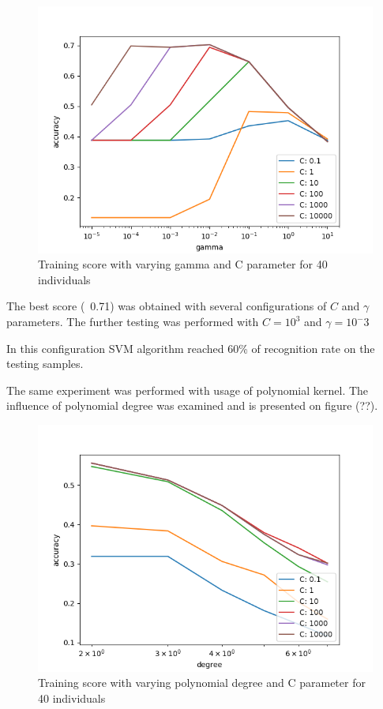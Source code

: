 \begin{figure}[H]
\centering
\includegraphics[scale=0.75]{img/svm/better_graphs/CFD_40i_rbf.png}
\caption{Training score with varying gamma and C parameter for 40 individuals}
\end{figure} 

The best score (~0.71) was obtained with several configurations of $C$ and $\gamma$ parameters. The further testing was performed with $C = 10^3$ and $\gamma = 10^-3$

In this configuration SVM algorithm reached 60\% of recognition rate on the testing samples.

The same experiment was performed with usage of polynomial kernel. 
The influence of polynomial degree was examined and is presented on figure (??).

\begin{figure}[H]
\centering
\includegraphics[scale=0.75]{img/svm/better_graphs/CFD_40i_poly.png}
\caption{Training score with varying polynomial degree and C parameter for 40 individuals}
\end{figure} 

